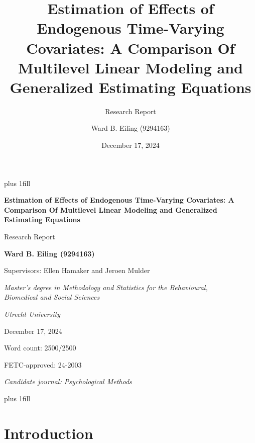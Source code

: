 \documentclass[
  11pt,
  a4paper,
]{article}
\title{Estimation of Effects of Endogenous Time-Varying Covariates: A
Comparison Of Multilevel Linear Modeling and Generalized Estimating
Equations}
\subtitle{Research Report}
\author{Ward B. Eiling (9294163)}
\date{December 17, 2024}
\begin{document}
\cleardoublepage
\thispagestyle{empty}
{\centering
\hbox{}\vskip 0cm plus 1fill
{\Large\bfseries Estimation of Effects of Endogenous Time-Varying
Covariates: A Comparison Of Multilevel Linear Modeling and Generalized
Estimating Equations \par}
\vspace{3ex}
{\large Research Report \par}
\vspace{9ex}
{\large\bfseries Ward B. Eiling (9294163) \par}
\vspace{3ex}
{\large Supervisors: Ellen Hamaker and Jeroen Mulder \par}
\vspace{9ex}
{\normalsize \textit{Master's degree in Methodology and Statistics for the Behavioural, \\ Biomedical and Social Sciences} \par}
\vspace{3ex}
{\normalsize \textit{Utrecht University} \par}
\vspace{9ex}
{\normalsize December 17, 2024 \par}
\vspace{3ex}
{\normalsize Word count: 2500/2500 \par}
\vspace{9ex}
{\normalsize FETC-approved: 24-2003 \par}
\vspace{9ex}
{\normalsize \textit{Candidate journal: Psychological Methods} \par}
\hbox{}\vskip 0cm plus 1fill
}


\newpage

\section{Introduction}\label{introduction}
\end{document}
